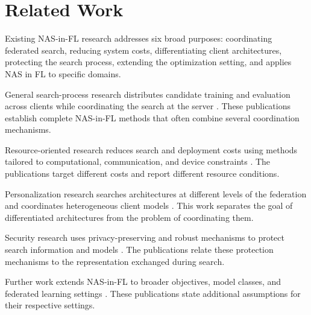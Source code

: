 \chapter{Related Work}\label{chapter:related-work}

Existing NAS-in-FL research addresses six broad purposes: coordinating federated search, reducing system costs, differentiating client architectures, protecting the search process, extending the optimization setting, and applies NAS in FL to specific domains.

General search-process research distributes candidate training and evaluation across clients while coordinating the search at the server \cite{dfnas_2020,efficient_model_training_fednas_2024,federated_bayesian_optimization_nas_2023,fednas_2021,rl_fednas_2021,rt_fed_evo_nas_2020}. These publications establish complete NAS-in-FL methods that often combine several coordination mechanisms.

Resource-oriented research reduces search and deployment costs using methods tailored to computational, communication, and device constraints \cite{decnas_2022,fednas_over_hetero_mobile_devices_2022,divide-and-conquer_fednas_2023,efnas_2024,f2nas_2024,fedoras_2022,fgfl_2024,finch_2024,network_aware_fed_nas_2025,optimize_fednas_edge_2021,rafl_2024,superfednas_2024,supernet_trade-off_fednas_2025}. The publications target different costs and report different resource conditions.

Personalization research searches architectures at different levels of the federation and coordinates heterogeneous client models \cite{clustered_direct_fednas_2022,collaborative_nas_for_pfl_2025,enasfl_2024,fedpnas_2021,hafl_2022,hapfnas_2025,hfedghn_2023,peaches_2024,perfedrlnas_2024,spider_2021}. This work separates the goal of differentiated architectures from the problem of coordinating them.

Security research uses privacy-preserving and robust mechanisms to protect search information and models \cite{dp-fnas_2020,fednas_based_attack_2024,hetefed_2023,multi-granular_fednas_2023,privacy-preserving_nas_across_fl_iot_2021,privacy_preserving_fednas_for_edge_2025}. The publications relate these protection mechanisms to the representation exchanged during search.

Further work extends NAS-in-FL to broader objectives, model classes, and federated learning settings \cite{aging_fednas_2025,apons_2023,feathers_2023,fed_meta_nas_2025,fednaspet_2023,fl-agnns_2023,gpt4-boosted_pso_fednas_2024,multi_objective_evo_fl_2020,nasfly_2024,pfgnas_2025,self-supervised_vertical_fednas_2023}. These publications state additional assumptions for their respective settings.

